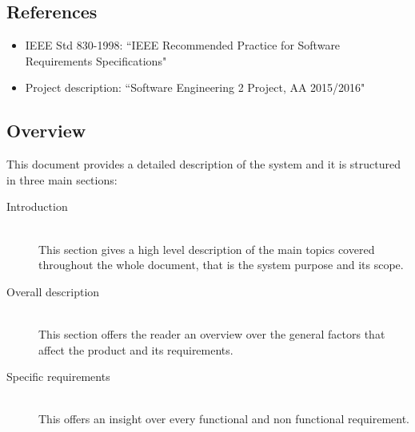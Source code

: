 \subsection{References}
\begin{itemize}
\item IEEE Std 830-1998: ``IEEE Recommended Practice for Software Requirements Specifications"
\item Project description: ``Software Engineering 2 Project, AA 2015/2016"
\end{itemize}


\subsection{Overview}
This document provides a detailed description of the system and it is structured in three main sections:

\begin{description}
  \item[Introduction] \hfill \\
  This section gives a high level description of the main topics covered throughout the whole document, that is the system purpose and its scope.
  \item[Overall description] \hfill \\
  This section offers the reader an overview over the general factors that affect the product and its requirements.
  \item[Specific requirements] \hfill \\
  This offers an insight over every functional and non functional requirement.
\end{description}